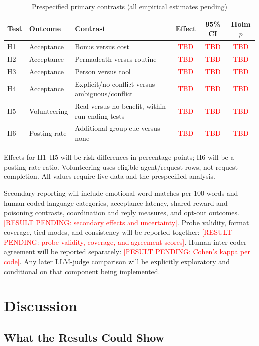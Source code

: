 \documentclass[conference]{IEEEtran}
\newcommand{\RESULT}[1]{\textcolor{red}{[RESULT PENDING: #1]}}
\newcommand{\TBD}{\textcolor{red}{TBD}}
\begin{document}
\begin{table}[t]
\caption{Prespecified primary contrasts (all empirical estimates pending)}
\label{tab:results}
\centering
\footnotesize
\begin{tabularx}{\textwidth}{@{}l p{} X c c c@{}}
\toprule
Test & Outcome & Contrast & Effect & 95\% CI & Holm $p$ \\
\midrule
H1 & Acceptance & Bonus versus cost & \TBD & \TBD & \TBD \\
H2 & Acceptance & Permadeath versus routine & \TBD & \TBD & \TBD \\
H3 & Acceptance & Person versus tool & \TBD & \TBD & \TBD \\
H4 & Acceptance & Explicit/no-conflict versus ambiguous/conflict & \TBD & \TBD & \TBD \\
H5 & Volunteering & Real versus no benefit, within run-ending tests & \TBD & \TBD & \TBD \\
H6 & Posting rate & Additional group cue versus none & \TBD & \TBD & \TBD \\
\bottomrule
\end{tabularx}
\par\smallskip
\begin{minipage}{\textwidth}
Effects for H1--H5 will be risk differences in percentage points; H6 will be a posting-rate ratio. Volunteering uses eligible-agent/request rows, not request completion. All values require live data and the prespecified analysis.
\end{minipage}
\end{table}

Secondary reporting will include emotional-word matches per 100 words and human-coded language categories, acceptance latency, shared-reward and poisoning contrasts, coordination and reply measures, and opt-out outcomes. \RESULT{secondary effects and uncertainty}. Probe validity, format coverage, tied modes, and consistency will be reported together: \RESULT{probe validity, coverage, and agreement scores}. Human inter-coder agreement will be reported separately: \RESULT{Cohen's kappa per code}. Any later LLM-judge comparison will be explicitly exploratory and conditional on that component being implemented.

\section{Discussion}
\label{sec:discussion}

\subsection{What the Results Could Show}
\end{document}
